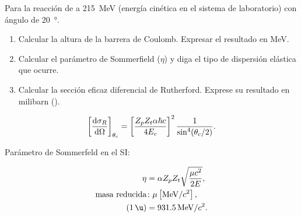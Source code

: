 \documentclass[./../main.tex]{subfiles}
\begin{document}
    \begin{exercise}
        Para la reacción de  a \SI{215}{\MeV} (energía cinética en el sistema de laboratorio) con  ángulo de \SI{20}{\degree}.

        \begin{enumerate}[label = \alph*)]
            \item Calcular la altura de la barrera de Coulomb. Expresar el resultado en \si{\MeV}.
            \item Calcular el parámetro de Sommerfield (\(\eta\)) y diga el tipo de dispersión elástica que ocurre.
            \item Calcular la sección eficaz diferencial de Rutherford. Exprese su resultado en milibarn (\si{\mb}).
        \end{enumerate}

        \begin{equation}
            \left[\odv{\sigma_{R}}{\Omega}\right]_{\theta_{c}} = \left[\dfrac{Z_{p}Z_{t}\alpha\hbar c}{4E_{c}}\right]^{2} \dfrac{1}{\sin^{4}(\theta_{c} / 2)}.
        \end{equation}

        Parámetro de Sommerfeld en el SI:

        \begin{align*}
            \eta &= \alpha Z_{p}Z_{t} \sqrt{\dfrac{\mu c^{2}}{2E}},\\
            \text{masa reducida} &\colon \mu \left[\si{\MeV}/c^{2}\right],\nonumber\\
            (\SI{1}{\u}) &= \SI{931.5}{\MeV} / c^{2}.
        \end{align*}
    \end{exercise}
\end{document}
